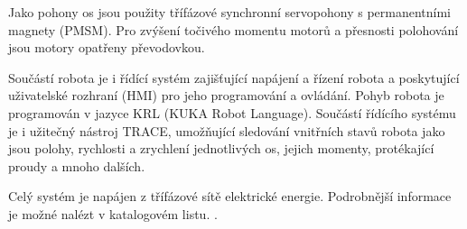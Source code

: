 Jako pohony os jsou použity třífázové synchronní servopohony s permanentními magnety (PMSM). Pro zvýšení točivého momentu motorů a přesnosti polohování jsou motory opatřeny převodovkou. 

Součástí robota je i řídící systém zajišťující napájení a řízení robota a poskytující uživatelské rozhraní (HMI) pro jeho programování a ovládání. Pohyb robota je programován v jazyce KRL (KUKA Robot Language). Součástí řídícího systému je i užitečný nástroj TRACE, umožňující sledování vnitřních stavů robota jako jsou polohy, rychlosti a zrychlení jednotlivých os, jejich momenty, protékající proudy a mnoho dalších. 

Celý systém je napájen z třífázové sítě elektrické energie. Podrobnější informace je možné nalézt v katalogovém listu. \cite{kuka_datasheet_url}.